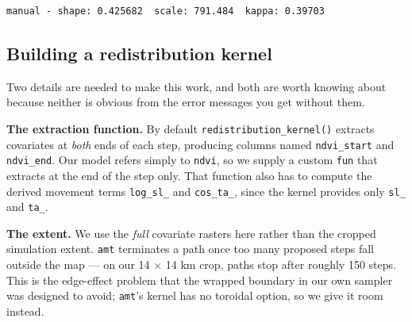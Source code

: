 \documentclass[
  letterpaper,
  DIV=11,
  numbers=noendperiod]{scrartcl}
\newenvironment{Shaded}{\begin{snugshade}}{\end{snugshade}}
\newcommand{\DecValTok}[1]{\textcolor[rgb]{0.68,0.00,0.00}{#1}}
\newcommand{\FunctionTok}[1]{\textcolor[rgb]{0.28,0.35,0.67}{#1}}
\newcommand{\NormalTok}[1]{\textcolor[rgb]{0.00,0.23,0.31}{#1}}
\newcommand{\SpecialCharTok}[1]{\textcolor[rgb]{0.37,0.37,0.37}{#1}}
\newcommand{\StringTok}[1]{\textcolor[rgb]{0.13,0.47,0.30}{#1}}
\begin{document}
\begin{Shaded}
\end{Shaded}

\begin{verbatim}
manual - shape: 0.425682  scale: 791.484  kappa: 0.39703 
\end{verbatim}

\subsection{Building a redistribution
kernel}\label{building-a-redistribution-kernel}

Two details are needed to make this work, and both are worth knowing
about because neither is obvious from the error messages you get without
them.

\textbf{The extraction function.} By default
\texttt{redistribution\_kernel()} extracts covariates at \emph{both}
ends of each step, producing columns named \texttt{ndvi\_start} and
\texttt{ndvi\_end}. Our model refers simply to \texttt{ndvi}, so we
supply a custom \texttt{fun} that extracts at the end of the step only.
That function also has to compute the derived movement terms
\texttt{log\_sl\_} and \texttt{cos\_ta\_}, since the kernel provides
only \texttt{sl\_} and \texttt{ta\_}.

\textbf{The extent.} We use the \emph{full} covariate rasters here
rather than the cropped simulation extent. \texttt{amt} terminates a
path once too many proposed steps fall outside the map --- on our 14 ×
14 km crop, paths stop after roughly 150 steps. This is the edge-effect
problem that the wrapped boundary in our own sampler was designed to
avoid; \texttt{amt}'s kernel has no toroidal option, so we give it room
instead.
\end{document}
